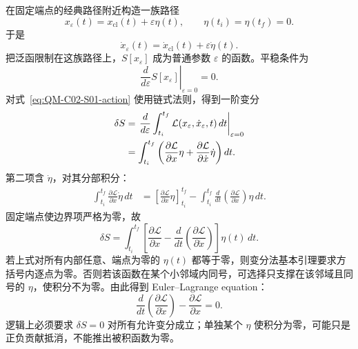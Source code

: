 在固定端点的经典路径附近构造一族路径
\begin{equation}
  x_\varepsilon(t)=x_{\mathrm{cl}}(t)+\varepsilon\eta(t),
  \qquad
  \eta(t_i)=\eta(t_f)=0.
  \label{eq:QM-C02-S01-varied-path}
\end{equation}
于是
\[
  \dot x_\varepsilon(t)
  =\dot x_{\mathrm{cl}}(t)+\varepsilon\dot\eta(t).
\]
把泛函限制在这族路径上，$S[x_\varepsilon]$ 成为普通参数 $\varepsilon$ 的函数。平稳条件为
\begin{equation}
  \left.\frac{d}{d\varepsilon}S[x_\varepsilon]
  \right|_{\varepsilon=0}=0.
  \label{eq:QM-C02-S01-epsilon-stationary}
\end{equation}
对式~\eqref{eq:QM-C02-S01-action} 使用链式法则，得到一阶变分
\begin{align}
  \delta S
  &=\left.\frac{d}{d\varepsilon}
    \int_{t_i}^{t_f}
    \mathcal L(x_\varepsilon,\dot x_\varepsilon,t)\,dt
    \right|_{\varepsilon=0} \notag\\
  &=\int_{t_i}^{t_f}
    \left(
      \frac{\partial\mathcal L}{\partial x}\eta
      +\frac{\partial\mathcal L}{\partial\dot x}\dot\eta
    \right)dt.
  \label{eq:QM-C02-S01-first-variation}
\end{align}
第二项含 $\dot\eta$，对其分部积分：
\begin{align}
  \int_{t_i}^{t_f}
  \frac{\partial\mathcal L}{\partial\dot x}\dot\eta\,dt
  &=\left[
    \frac{\partial\mathcal L}{\partial\dot x}\eta
    \right]_{t_i}^{t_f}
  -\int_{t_i}^{t_f}
    \frac{d}{dt}
    \left(\frac{\partial\mathcal L}{\partial\dot x}\right)
    \eta\,dt.
  \label{eq:QM-C02-S01-variation-integration-by-parts}
\end{align}
固定端点使边界项严格为零，故
\begin{equation}
  \delta S
  =\int_{t_i}^{t_f}
  \left[
    \frac{\partial\mathcal L}{\partial x}
    -\frac{d}{dt}
    \left(\frac{\partial\mathcal L}{\partial\dot x}\right)
  \right]\eta(t)\,dt.
  \label{eq:QM-C02-S01-variation-after-parts}
\end{equation}
若上式对所有内部任意、端点为零的 $\eta(t)$ 都等于零，则变分法基本引理要求方括号内逐点为零。否则若该函数在某个小邻域内同号，可选择只支撑在该邻域且同号的 $\eta$，使积分不为零。由此得到 Euler--Lagrange equation：
\begin{equation}
  \boxed{
  \frac{d}{dt}
  \left(\frac{\partial\mathcal L}{\partial\dot x}\right)
  -\frac{\partial\mathcal L}{\partial x}=0.}
  \label{eq:QM-C02-S01-euler-lagrange}
\end{equation}
逻辑上必须要求 $\delta S=0$ 对所有允许变分成立；单独某个 $\eta$ 使积分为零，可能只是正负贡献抵消，不能推出被积函数为零。

